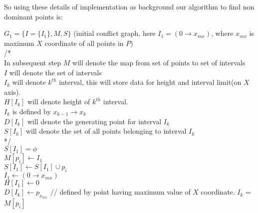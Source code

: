 \documentclass[a4paper]{article}
\begin{document}
\pagebreak

So using these details of implementation as background our algorithm to find non dominant points is:

\begin{algorithm}[H]
\SetAlgoLined
{}
  $G_1 = \{ I = \{ I_1 \}, M, S \}$ (initial conflict graph, here $I_1 = (0\rightarrow x_{mx})$, where $x_{mx}$ is maximum $X$ coordinate of all points in $P$) \\
  /* \\
  In subsequent step $M$ will denote the map from set of points to set of intervals \\
  $I$ will denote the set of intervals \\
  $I_k$ will denote $k^{th}$ interval, this will store data for height and interval limit(on $X$ axis).\\
  $H[I_k]$ will denote height of $k^{th}$ interval.\\
  $I_k$ is defined by $x_{k-1} \rightarrow x_k$\\
  $D[I_k]$ will denote the generating point for interval $I_k$ \\
  $S[I_k]$ will denote the set of all points belonging to interval $I_k$ \\
  */ \\
  $S[I_1] = \phi$ \\
   {
  	$M[p_i] \leftarrow I_1$\\
    $S[I_1] \leftarrow S[I_1] \cup {p_i}$ \\
  }
  $I_1 \leftarrow (0\rightarrow x_{mx})$ \\
  $H[I_1] \leftarrow 0$\\
  $D[I_k] \leftarrow p_{x_{mx}}$ // defined by point having maximum value of $X$ coordinate.
  {
 	$I_k$ = $M[p_i]$ \\
 	}
\end{algorithm}
\end{document}
